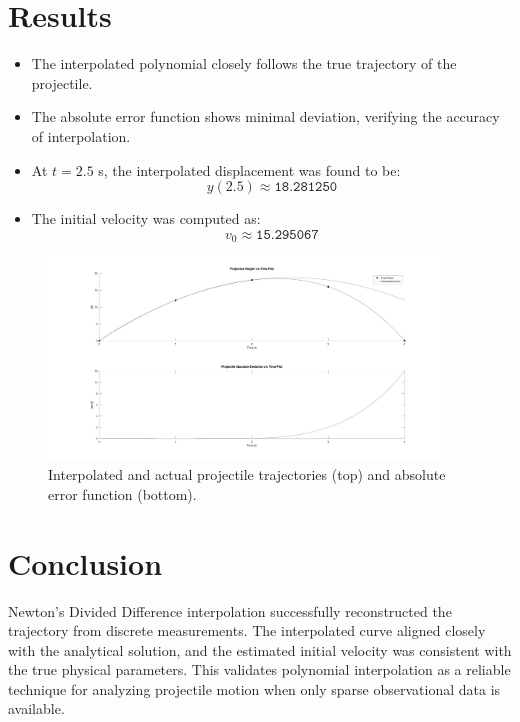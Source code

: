 \section*{Results}
\begin{itemize}
  \item The interpolated polynomial closely follows the true trajectory of the projectile.
  \item The absolute error function shows minimal deviation, verifying the accuracy of interpolation.
  \item At $t=2.5$ s, the interpolated displacement was found to be:
  \[
  y(2.5) \approx \texttt{18.281250}
  \]
  \item The initial velocity was computed as:
  \[
  v_0 \approx \texttt{15.295067}
  \]
\end{itemize}

\begin{figure}[h!]
  \centering
  \includegraphics[width=0.93\textwidth]{a1.jpg}
  \caption{Interpolated and actual projectile trajectories (top) and absolute error function (bottom).}
\end{figure}

\section*{Conclusion}
Newton’s Divided Difference interpolation successfully reconstructed the trajectory from discrete measurements. The interpolated curve aligned closely with the analytical solution, and the estimated initial velocity was consistent with the true physical parameters. This validates polynomial interpolation as a reliable technique for analyzing projectile motion when only sparse observational data is available.

